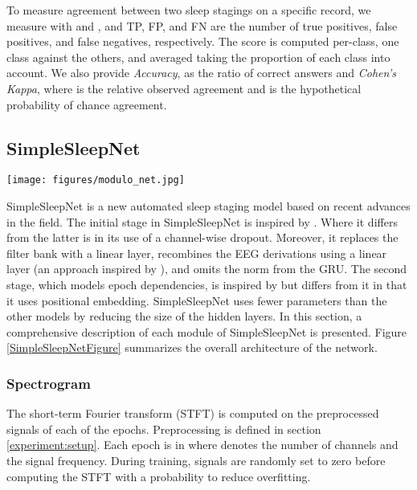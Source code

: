 \documentclass[journal]{IEEEtran}
\begin{document}
To measure agreement between two sleep stagings on a specific record, we measure   with  and , and TP, FP, and FN are the number of true positives, false positives, and false negatives, respectively. The score is computed per-class, one class against the others, and averaged taking the proportion of each class into account. We also provide \textit{Accuracy}, as the ratio of correct answers and \textit{Cohen's Kappa},  where  is the relative observed agreement and  is the hypothetical probability of chance agreement.

\subsection{SimpleSleepNet}
\label{sec:simple_sleep_net}

\begin{figure*}
\begin{center}
  \texttt{[image: figures/modulo\_net.jpg]}
  \caption{\textbf{SimpleSleepNet overview diagram:} 
   represent the hidden state from the previous epoch of the sequence and  the hidden state from the next epoch of the sequence.  is the embedding of the current epoch.}
  \label{SimpleSleepNetFigure}
\end{center}
\vspace{-1.8em}
\end{figure*}


SimpleSleepNet is a new automated sleep staging model based on recent advances in the field. The initial stage in SimpleSleepNet is inspired by \cite{Phan2019}. Where it differs from the latter is in its use of a channel-wise dropout. Moreover, it replaces the filter bank with a linear layer, recombines the EEG derivations using a linear layer (an approach inspired by  \cite{Chambon2018}), and omits the norm from the GRU. The second stage, which models epoch dependencies, is inspired by \cite{Supratak2017} but differs from it in that it uses positional embedding. SimpleSleepNet uses fewer parameters than the other models by reducing the size of the hidden layers.
In this section, a comprehensive description of each module of SimpleSleepNet is presented. Figure \ref{SimpleSleepNetFigure} summarizes the overall architecture of the network.

\subsubsection{Spectrogram}
The short-term Fourier transform (STFT)  is computed on the preprocessed signals of each of the epochs. Preprocessing is defined in section \ref{experiment:setup}. Each epoch is in  where  denotes the number of channels and  the signal frequency. During training, signals are randomly set to zero before computing the STFT with a probability  to reduce overfitting.  
\end{document}
